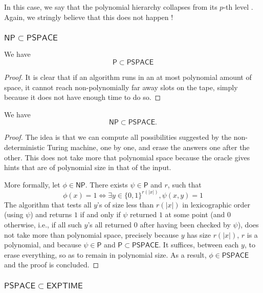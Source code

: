 In this case, we say that the polynomial hierarchy \og collapses from its $p$-th level \fg. Again, we stringly believe that this does not happen !

\subsubsection{$ \mathsf{NP} \subset \mathsf{PSPACE} $}

\begin{proposition}
    We have
    \[
        \mathsf{P} \subset \mathsf{PSPACE}
    \]
\end{proposition}

\begin{proof}
    It is clear that if an algorithm runs in an at most polynomial amount of space, it cannot reach non-polynomially far away slots on the tape, simply because it does not have enough time to do so.
\end{proof}

\begin{proposition}
    We have
    \[
        \mathsf{NP} \subset \mathsf{PSPACE}.
    \]
\end{proposition}

\begin{proof}
    The idea is that we can compute all possibilities suggested by the non-deterministic Turing machine, one by one, and erase the answers one after the other. This does not take more that polynomial space because the oracle gives hints that are of polynomial size in that of the input.

    More formally, let $ \phi \in \mathsf{NP} $. There exists $ \psi \in \mathsf P $ and $ r $, such that
    \[
        \phi(x) = 1 \iff \exists y \in \{ 0,1 \}^{r(|x|)}, \psi(x,y) = 1
    \]
    The algorithm that tests all $y$'s of size less than $ r(|x|) $ in lexicographic order (using $ \psi $) and returns $ 1 $ if and only if $ \psi $ returned $ 1 $ at some point (and $ 0 $ otherwise, i.e., if all such $ y $'s all returned $ 0 $ after having been checked by $ \psi $), does not take more than polynomial space, precisely because $ y $ has size $ r(|x|) $, $ r $ is a polynomial, and because $ \psi \in \mathsf P $ and $ \mathsf P \subset \mathsf{PSPACE} $. It suffices, between each $ y $, to erase everything, so as to remain in polynomial size. As a result, $ \phi \in \mathsf{PSPACE} $ and the proof is concluded.
\end{proof}

\subsubsection{$ \mathsf{PSPACE} \subset \mathsf{EXPTIME} $}

